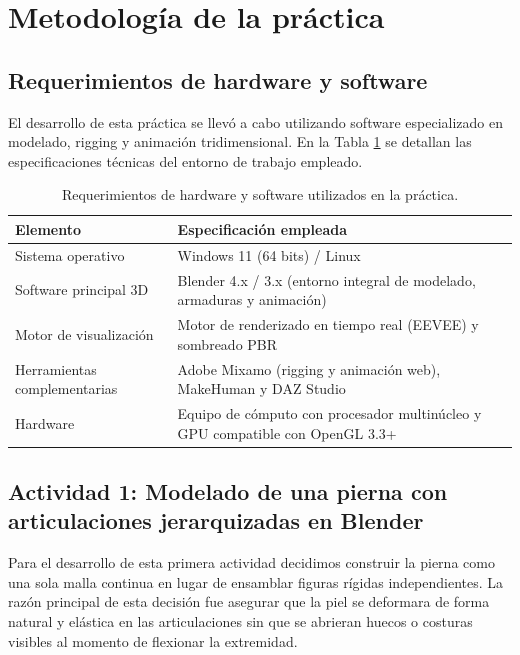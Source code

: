 
\section{Metodología de la práctica}

\subsection{Requerimientos de hardware y software}
El desarrollo de esta práctica se llevó a cabo utilizando software especializado en modelado, rigging y animación tridimensional. En la Tabla \ref{tab:requerimientos} se detallan las especificaciones técnicas del entorno de trabajo empleado.

\begin{table}[H]
\centering
\begin{tabular}{@{}p{4.2cm}p{11.0cm}@{}}
\toprule
\textbf{Elemento} & \textbf{Especificación empleada} \\
\midrule
Sistema operativo & Windows 11 (64 bits) / Linux \\
Software principal 3D & Blender 4.x / 3.x (entorno integral de modelado, armaduras y animación) \\
Motor de visualización & Motor de renderizado en tiempo real (EEVEE) y sombreado PBR \\
Herramientas complementarias & Adobe Mixamo (rigging y animación web), MakeHuman y DAZ Studio \\
Hardware & Equipo de cómputo con procesador multinúcleo y GPU compatible con OpenGL 3.3+ \\
\bottomrule
\end{tabular}
\caption{Requerimientos de hardware y software utilizados en la práctica.}
\label{tab:requerimientos}
\end{table}

\subsection{Actividad 1: Modelado de una pierna con articulaciones jerarquizadas en Blender}

Para el desarrollo de esta primera actividad decidimos construir la pierna como una sola malla continua en lugar de ensamblar figuras rígidas independientes. La razón principal de esta decisión fue asegurar que la piel se deformara de forma natural y elástica en las articulaciones sin que se abrieran huecos o costuras visibles al momento de flexionar la extremidad.

